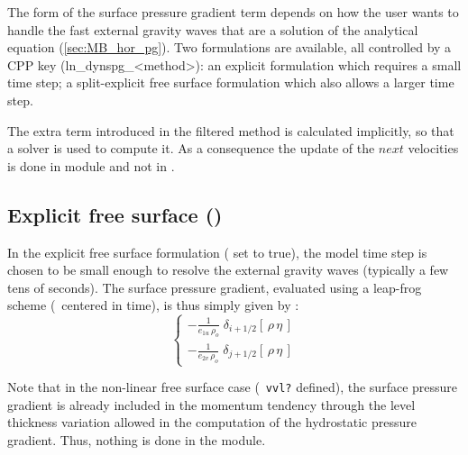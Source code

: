 \documentclass[../main/NEMO_manual]{subfiles}
\begin{document}
The form of the surface pressure gradient term depends on how the user wants to
handle the fast external gravity waves that are a solution of the analytical equation (\autoref{sec:MB_hor_pg}).
Two formulations are available, all controlled by a CPP key (ln\_dynspg\_<method>):
an explicit formulation which requires a small time step;
a split-explicit free surface formulation which also allows a larger time step.

The extra term introduced in the filtered method is calculated implicitly, so that a solver is used to compute it.
As a consequence the update of the $next$ velocities is done in module  and not in .

\subsection[Explicit free surface (\forcode{ln_dynspg_exp})]{Explicit free surface (\protect{})}
\label{subsec:DYN_spg_exp}

In the explicit free surface formulation ( set to true),
the model time step is chosen to be small enough to resolve the external gravity waves
(typically a few tens of seconds).
The surface pressure gradient, evaluated using a leap-frog scheme (\ie\ centered in time),
is thus simply given by :
\begin{equation}
  \label{eq:DYN_spg_exp}
  \left\{
    \begin{aligned}
      - \frac{1}{e_{1u}\,\rho_o} \;	\delta_{i+1/2} \left[  \,\rho \,\eta\,  \right] 	\\
      - \frac{1}{e_{2v}\,\rho_o} \;	\delta_{j+1/2} \left[  \,\rho \,\eta\,  \right]
    \end{aligned}
  \right.
\end{equation}

Note that in the non-linear free surface case (\ie\ \texttt{vvl?} defined),
the surface pressure gradient is already included in the momentum tendency through
the level thickness variation allowed in the computation of the hydrostatic pressure gradient.
Thus, nothing is done in the  module.

\end{document}
